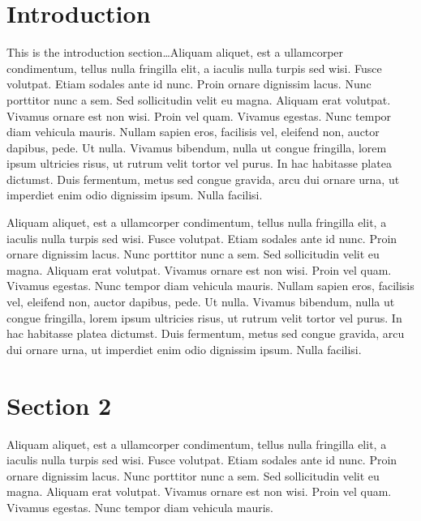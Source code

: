 \documentclass[11pt]{article}
\begin{document}
\newpage
\setcounter{page}{1} %
\section{Introduction}
\label{sec:intro}
\vspace{-0.2in}
%
This is the introduction section\ldots Aliquam aliquet, est a ullamcorper condimentum, tellus nulla fringilla elit, a iaculis nulla turpis sed wisi. Fusce volutpat. Etiam sodales ante id nunc. Proin ornare dignissim lacus. Nunc porttitor nunc a sem. Sed sollicitudin velit eu magna. Aliquam erat volutpat. Vivamus ornare est non wisi. Proin vel quam. Vivamus egestas. Nunc tempor diam vehicula mauris. Nullam sapien eros, facilisis vel, eleifend non, auctor dapibus, pede. Ut nulla. Vivamus bibendum, nulla ut congue fringilla, lorem ipsum ultricies risus, ut rutrum velit tortor vel purus. In hac habitasse platea dictumst. Duis fermentum, metus sed congue gravida, arcu dui ornare urna, ut imperdiet enim odio dignissim ipsum. Nulla facilisi. 

Aliquam aliquet, est a ullamcorper condimentum, tellus nulla fringilla elit, a iaculis nulla turpis sed wisi. Fusce volutpat. Etiam sodales ante id nunc. Proin ornare dignissim lacus. Nunc porttitor nunc a sem. Sed sollicitudin velit eu magna. Aliquam erat volutpat. Vivamus ornare est non wisi. Proin vel quam. Vivamus egestas. Nunc tempor diam vehicula mauris. Nullam sapien eros, facilisis vel, eleifend non, auctor dapibus, pede. Ut nulla. Vivamus bibendum, nulla ut congue fringilla, lorem ipsum ultricies risus, ut rutrum velit tortor vel purus. In hac habitasse platea dictumst. Duis fermentum, metus sed congue gravida, arcu dui ornare urna, ut imperdiet enim odio dignissim ipsum. Nulla facilisi. 

\section{Section 2}
\label{sec:section_2_label}
\vspace{-0.2in}
%
Aliquam aliquet, est a ullamcorper condimentum, tellus nulla fringilla elit, a iaculis nulla turpis sed wisi. Fusce volutpat. Etiam sodales ante id nunc. Proin ornare dignissim lacus. Nunc porttitor nunc a sem. Sed sollicitudin velit eu magna. Aliquam erat volutpat. Vivamus ornare est non wisi. Proin vel quam. Vivamus egestas. Nunc tempor diam vehicula mauris. 
\end{document}
